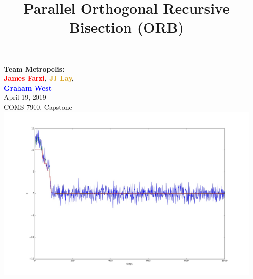 \documentclass[usernames,dvipsnames]{beamer}
\title[Capstone]{Parallel Orthogonal Recursive Bisection (ORB)}
\date{}
\begin{document}
\begin{frame}
	\titlepage
	
	\vspace{-65pt}
		
		\centering
		\textbf{Team Metropolis: \\
		\textcolor{red}{James Farzi}, \textcolor{Goldenrod}{JJ Lay}, \\ \textcolor{blue}{Graham West}} \\
		\vspace{10pt}
		April 19, 2019 \\
		\vspace{10pt}
		COMS 7900, Capstone \\
		\vspace{-1pt}
		\includegraphics[scale = 0.1]{images/PosterPlot_Ackley_Chain_good_00}
	\endminipage\hfill %
		\centering

\end{frame}
\end{document}
